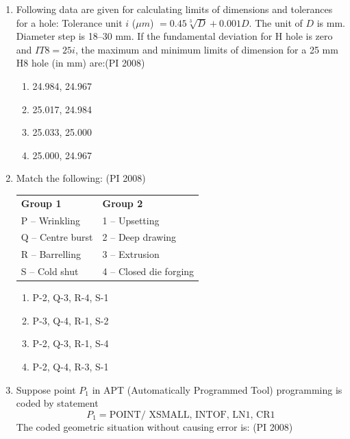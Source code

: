 \documentclass[journal,12pt,onecolumn]{IEEEtran}
\theoremstyle{remark}
\begin{document}
\begin{enumerate}
\begin{multicols}{4}
\begin{enumerate}
\end{enumerate}
\end{multicols}
\vspace{1cm}
\item %
Following data are given for calculating limits of dimensions and tolerances for a hole:  
Tolerance unit $i$ ($\mu m$) $= 0.45\sqrt[3]{D} + 0.001D$.  
The unit of $D$ is mm. Diameter step is 18--30 mm.  
If the fundamental deviation for H hole is zero and $IT8 = 25i$, the maximum and minimum limits of dimension for a 25 mm H8 hole (in mm) are:\hfill{(PI 2008)}

\begin{multicols}{4}
    \begin{enumerate}
\item  24.984, 24.967 
\item  25.017, 24.984 
\item  25.033, 25.000 
\item 25.000, 24.967

\end{enumerate}
\end{multicols}


\vspace{0.5cm}
\item %
Match the following:  
\hfill{(PI 2008)}\\
\begin{tabular}{ll}
\textbf{Group 1} & \textbf{Group 2} \\
P -- Wrinkling & 1 -- Upsetting \\
Q -- Centre burst & 2 -- Deep drawing \\
R -- Barrelling & 3 -- Extrusion \\
S -- Cold shut & 4 -- Closed die forging \\
\end{tabular}

\begin{multicols}{4}
    \begin{enumerate}
\item  P-2, Q-3, R-4, S-1 
\item  P-3, Q-4, R-1, S-2 
\item  P-2, Q-3, R-1, S-4 
\item  P-2, Q-4, R-3, S-1
\end{enumerate}
\end{multicols}
\vspace{1cm}

\item %
Suppose point $P_1$ in APT (Automatically Programmed Tool) programming is coded by statement  
\[
P_1 = \text{POINT/ XSMALL, INTOF, LN1, CR1}
\]  
The coded geometric situation without causing error is:
\hfill{(PI 2008)}
\begin{itemize}


\end{itemize}
\end{enumerate}
\end{document}
